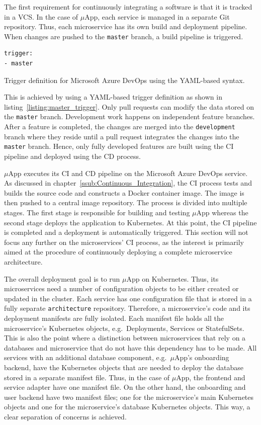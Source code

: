 The first requirement for continuously integrating a software is that it is
tracked in a \ac{VCS}. In the case of $\mu$App, each service is managed in a
separate Git repository. Thus, each microservice has its own build and
deployment pipeline. When changes are pushed to the \texttt{master} branch, a
build pipeline is triggered.

\begin{listing}[H]
  \begin{verbatim}
trigger:
- master
  \end{verbatim}
  \caption{Trigger definition for Microsoft Azure DevOps using the YAML-based syntax.}%
  \label{listing:master_trigger}
\end{listing}

This is achieved by using a YAML-based trigger definition as shown in
listing~\ref{listing:master_trigger}. Only pull requests can modify the data
stored on the \texttt{master} branch.  Development work happens on independent
feature branches. After a feature is completed, the changes are merged into the
\texttt{development} branch where they reside until a pull request integrates
the changes into the \texttt{master} branch. Hence, only fully developed
features are built using the \ac{CI} pipeline and deployed using the \ac{CD}
process.

$\mu$App executes its \ac{CI} and \ac{CD} pipeline on the Microsoft Azure
DevOps service. As discussed in chapter~\ref{ssub:Continuous_Integration}, the
\ac{CI} process tests and builds the source code and constructs a Docker
container image. The image is then pushed to a central image repository. The
process is divided into multiple stages. The first stage is responsible for
building and testing $\mu$App whereas the second stage deploys the application
to Kubernetes. At this point, the \ac{CI} pipeline is completed and a
deployment is automatically triggered. This section will not focus any further
on the microservices' \ac{CI} process, as the interest is primarily aimed at
the procedure of continuously deploying a complete microservice architecture.

The overall deployment goal is to run $\mu$App on Kubernetes. Thus, its
microservices need a number of configuration objects to be either created or
updated in the cluster. Each service has one configuration file that is stored
in a fully separate \texttt{architecture} repository. Therefore, a
microservice's code and its deployment manifests are fully isolated. Each
manifest file holds all the microservice's Kubernetes objects, e.g.\
Deployments, Services or StatefulSets.  This is also the point where a
distinction between microservices that rely on a databases and microservice
that do not have this dependency has to be made. All services with an
additional database component, e.g.\ $\mu$App's onboarding backend, have the
Kubernetes objects that are needed to deploy the database stored in a separate
manifest file. Thus, in the case of $\mu$App, the frontend and service adapter
have one manifest file. On the other hand, the onboarding and user backend have
two manifest files; one for the microservice's main Kubernetes objects and one
for the microservice's database Kubernetes objects.  This way, a clear
separation of concerns is achieved.


